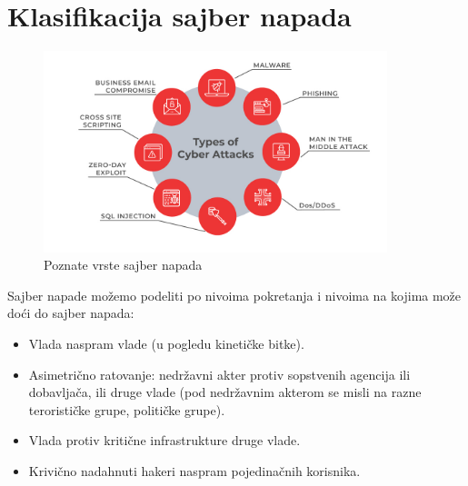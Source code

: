 \documentclass[a4paper]{article}
\begin{document}
{\section{Klasifikacija sajber napada}
\label{sec:naslovN}

\begin{figure}[h!]
  \centering
  \begin{center}
  \includegraphics[width=100mm]{proces2.jpg}
  \end{center}
  \caption{Poznate vrste sajber napada}
  \label{fig:vr1}
\end{figure}

Sajber napade možemo podeliti po nivoima pokretanja i nivoima na kojima može doći do sajber napada:
\begin{itemize}
    \item Vlada naspram vlade (u pogledu kinetičke bitke).
    \item Asimetrično ratovanje: nedržavni akter protiv sopstvenih agencija ili dobavljača, ili druge vlade (pod nedržavnim akterom se misli na razne terorističke grupe, političke grupe).
    \item Vlada protiv kritične infrastrukture druge vlade.
    \item  Krivično nadahnuti hakeri naspram pojedinačnih korisnika.
\end{itemize}



}
\end{document}

